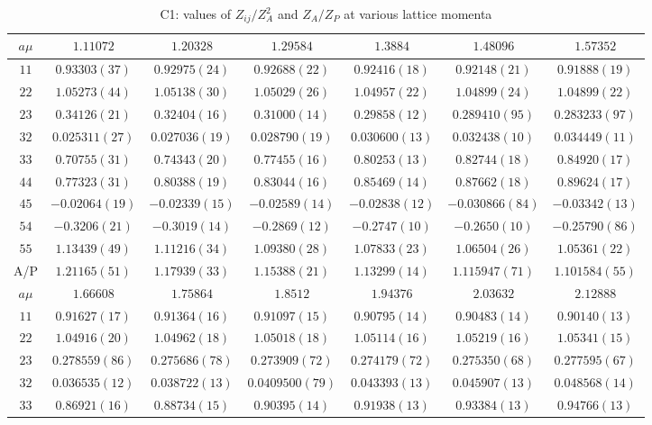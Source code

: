 \begin{table}
\begin{center}
\caption{C1: values of $Z_{ij}/Z_A^2$ and $Z_A/Z_P$ at various lattice momenta}
\begin{tabular}{c|c c c c c c}
\hline
\hline
$a\mu$ & $1.11072$ & $1.20328$ & $1.29584$ & $1.3884$ & $1.48096$ & $1.57352$ \\
\hline
$11$ & $0.93303(37)$ & $0.92975(24)$ & $0.92688(22)$ & $0.92416(18)$ & $0.92148(21)$ & $0.91888(19)$ \\
$22$ & $1.05273(44)$ & $1.05138(30)$ & $1.05029(26)$ & $1.04957(22)$ & $1.04899(24)$ & $1.04899(22)$ \\
$23$ & $0.34126(21)$ & $0.32404(16)$ & $0.31000(14)$ & $0.29858(12)$ & $0.289410(95)$ & $0.283233(97)$ \\
$32$ & $0.025311(27)$ & $0.027036(19)$ & $0.028790(19)$ & $0.030600(13)$ & $0.032438(10)$ & $0.034449(11)$ \\
$33$ & $0.70755(31)$ & $0.74343(20)$ & $0.77455(16)$ & $0.80253(13)$ & $0.82744(18)$ & $0.84920(17)$ \\
$44$ & $0.77323(31)$ & $0.80388(19)$ & $0.83044(16)$ & $0.85469(14)$ & $0.87662(18)$ & $0.89624(17)$ \\
$45$ & $-0.02064(19)$ & $-0.02339(15)$ & $-0.02589(14)$ & $-0.02838(12)$ & $-0.030866(84)$ & $-0.03342(13)$ \\
$54$ & $-0.3206(21)$ & $-0.3019(14)$ & $-0.2869(12)$ & $-0.2747(10)$ & $-0.2650(10)$ & $-0.25790(86)$ \\
$55$ & $1.13439(49)$ & $1.11216(34)$ & $1.09380(28)$ & $1.07833(23)$ & $1.06504(26)$ & $1.05361(22)$ \\
\hline
A/P & $1.21165(51)$ & $1.17939(33)$ & $1.15388(21)$ & $1.13299(14)$ & $1.115947(71)$ & $1.101584(55)$ \\
\hline
$a\mu$ & $1.66608$ & $1.75864$ & $1.8512$ & $1.94376$ & $2.03632$ & $2.12888$ \\
\hline
$11$ & $0.91627(17)$ & $0.91364(16)$ & $0.91097(15)$ & $0.90795(14)$ & $0.90483(14)$ & $0.90140(13)$ \\
$22$ & $1.04916(20)$ & $1.04962(18)$ & $1.05018(18)$ & $1.05114(16)$ & $1.05219(16)$ & $1.05341(15)$ \\
$23$ & $0.278559(86)$ & $0.275686(78)$ & $0.273909(72)$ & $0.274179(72)$ & $0.275350(68)$ & $0.277595(67)$ \\
$32$ & $0.036535(12)$ & $0.038722(13)$ & $0.0409500(79)$ & $0.043393(13)$ & $0.045907(13)$ & $0.048568(14)$ \\
$33$ & $0.86921(16)$ & $0.88734(15)$ & $0.90395(14)$ & $0.91938(13)$ & $0.93384(13)$ & $0.94766(13)$ \\

\end{tabular}
\end{center}
\end{table}
